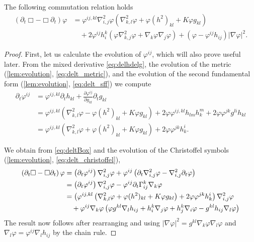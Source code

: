 \documentclass{amsart}
\begin{document}
\begin{lemma}
\label{lem:deltBox}
The following commutation relation holds
\[
\begin{split}
(\partial_{t}\Box - \Box\partial_{t}) \varphi &= \varphi^{ij,kl} \nabla^2_{i,j} \varphi (\nabla^2_{k,l} \varphi + \varphi (h^2)_{kl} + K \varphi g_{kl}) \\
&\quad + 2\varphi^{ij}h^{k}_{i} (\varphi \nabla^2_{k,j} \varphi + \nabla_k \varphi \nabla_j \varphi) + (\varphi - \varphi^{ij}h_{ij})| \nabla\varphi|^{2}.
\end{split}
\]
\end{lemma}

\begin{proof}
First, let us calculate the evolution of \(\varphi^{ij}\), which will also prove useful later. From the mixed derivative \cref{eq:delhdelg}, the evolution of the metric (\cref{lem:evolution}, \cref{eq:delt_metric}), and the evolution of the second fundamental form (\cref{lem:evolution}, \cref{eq:delt_sff}) we compute
\begin{equation}
\label{eq:deltBox}
\begin{split}
\partial_{t} \varphi^{ij} &= \varphi^{ij,kl} \partial_t h_{kl} + \frac{\partial\varphi^{ij}}{\partial g_{kl}} \partial_t g_{kl} \\
&= \varphi^{ij,kl} \left(\nabla^2_{k,l} \varphi - \varphi(h^2)_{kl} + K \varphi g_{kl}\right) + 2\varphi \varphi^{ij,kl} h_{lm}h^{m}_{k} + 2\varphi\varphi^{jk}g^{li}h_{kl} \\
&=\varphi^{ij,kl} \left(\nabla^2_{k,l} \varphi + \varphi(h^2)_{kl} + K \varphi g_{kl}\right) + 2\varphi\varphi^{jk}h^{i}_{k}.
\end{split}
\end{equation}

We obtain from \cref{eq:deltBox} and the evolution of the Christoffel symbols (\cref{lem:evolution}, \cref{eq:delt_christoffel}),
\[
\begin{split}
\left(\partial_{t}\Box - \Box\partial_{t}\right) \varphi &= \left(\partial_{t}\varphi^{ij}\right) \nabla^2_{i,j} \varphi + \varphi^{ij} \left(\partial_{t} \nabla^2_{i,j} \varphi - \nabla^2_{i,j} \partial_t \varphi\right) \\
&= \left(\partial_{t}\varphi^{ij}\right) \nabla^2_{i,j} \varphi - \varphi^{ij}\partial_t \Gamma^{k}_{ij} \nabla_k \varphi \\
&= \left(\varphi^{ij,kl} \left(\nabla^2_{k,l} \varphi + \varphi(h^2)_{kl} + K \varphi g_{kl}\right) + 2\varphi\varphi^{jk}h^{i}_{k}\right) \nabla^2_{i,j} \varphi \\
&\quad + \varphi^{ij} \nabla_k \varphi \left(\varphi g^{kl} \nabla_l h_{ij} + h^k_i \nabla_j \varphi + h^k_j \nabla_i \varphi - g^{kl} h_{ij} \nabla_l \varphi\right)
\end{split}
\]
The result now follows after rearranging and using \(|\nabla \varphi|^2 = g^{kl}\nabla_k \varphi \nabla_l \varphi\) and \(\nabla_l \varphi = \varphi^{ij} \nabla_l h_{ij}\) by the chain rule.
\end{proof}
\end{document}
